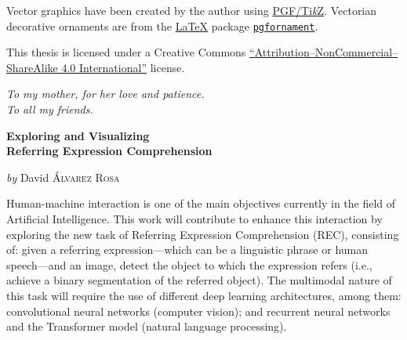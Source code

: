Vector graphics have been created by the author using
\href{https://www.ctan.org/pkg/pgf}{PGF/Ti\emph{k}Z}. Vectorian decorative
ornaments are from the \href{https://www.latex-project.org//}{\LaTeX} package
\href{https://ctan.org/pkg/pgfornament}{\texttt{pgfornament}}.

\bigskip\noindent
\begin{minipage}{.66\textwidth}
  This thesis is licensed under a Creative Commons
  \href{https://creativecommons.org/licenses/by-nc-sa/4.0/deed.en}{``At\-tri\-bu\-tion--NonCommercial--ShareAlike
    4.0 International''} license.%
\end{minipage}\hfill
\begin{minipage}{.265\textwidth}
  \doclicenseImage[imagewidth=\textwidth]%
\end{minipage}
\normalsize



\cleardoublepage{}
\thispagestyle{empty}
\begin{flushright}
  \itshape{}
  To my mother, for her love and patience. \\
  To all my friends.
\end{flushright}



\cleardoublepage{}
\thispagestyle{plain}
\null\vfill

\begin{center}
  \Large
  \textbf{Exploring and Visualizing\\
    Referring Expression Comprehension}

  \vspace{2ex}
  \large
  \textit{by} David \textsc{Álvarez Rosa}

  \vspace{3ex}
  \textbf{\abstractname}
\end{center}

\vspace{-2ex}
\noindent Human-machine interaction is one of the main objectives currently in
the field of Artificial Intelligence. This work will contribute to enhance this
interaction by exploring the new task of Referring Expression Comprehension
(REC), consisting of: given a referring expression---which can be a linguistic
phrase or human speech---and an image, detect the object to which the
expression refers (i.e., achieve a binary segmentation of the referred
object). The multimodal nature of this task will require the use of different
deep learning architectures, among them: convolutional neural networks
(computer vision); and recurrent neural networks and the Transformer model
(natural language processing).

